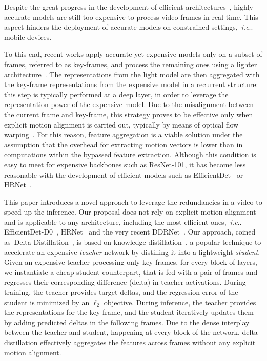 \documentclass[runningheads]{llncs}
\makeatletter
\newcommand{\deltadist}{Delta Distillation~}
\DeclareRobustCommand\onedot{\futurelet\@let@token\@onedot}
\def\@onedot{\ifx\@let@token.\else.\null\fi\xspace}
\def\ie{\emph{i.e}\onedot} \def\Ie{\emph{I.e}\onedot}
\makeatother
\begin{document}
Despite the great progress in the development of efficient architectures~\cite{fasterseg,li2017PruningFF,zhang2016acceleratingvd,fanet,hrnet,efficientdet}, highly accurate models are still too expensive to process video frames in real-time.
This aspect hinders the deployment of accurate models on constrained settings,~\ie mobile devices.

To this end, recent works apply accurate yet expensive models only on a subset of frames, referred to as key-frames, and process the remaining ones using a lighter architecture~\cite{zhu17dff,accel,flow_guided,li2018low,liu2018mobile,memory_guided}. 
The representations from the light model are then aggregated with the key-frame representations from the expensive model in a recurrent structure: this step is typically performed at a deep layer, in order to leverage the representation power of the expensive model. 
Due to the misalignment between the current frame and key-frame, this strategy proves to be effective only when explicit motion alignment is carried out, typically by means of optical flow warping~\cite{zhu17dff,accel,flow_guided}.
For this reason, feature aggregation is a viable solution under the assumption that the overhead for extracting motion vectors is lower than in computations within the bypassed feature extraction.
Although this condition is easy to meet for expensive backbones such as ResNet-101, it has become less reasonable with the development of efficient models such as EfficientDet~\cite{efficientdet} or HRNet~\cite{hrnet}.

This paper introduces a novel approach to leverage the redundancies in a video to speed up the inference. 
Our proposal does not rely on explicit motion alignment and is applicable to any architecture, including the most efficient ones,~\ie EfficientDet-D0~\cite{efficientdet}, HRNet~\cite{hrnet} and the very recent DDRNet~\cite{ddrnet}. 
Our approach, coined as~\deltadist, is based on knowledge distillation~\cite{distillationsurvey,hinton}, a popular technique to accelerate an expensive \textit{teacher} network by distilling it into a lightweight \textit{student}.
Given an expensive teacher processing only key-frames, for every block of layers, we instantiate a cheap student counterpart, that is fed with a pair of frames and regresses their corresponding difference (delta) in teacher activations.
During training, the teacher provides target deltas, and the regression error of the student is minimized by an $\ell_2$ objective.
During inference, the teacher provides the representations for the key-frame, and the student iteratively updates them by adding predicted deltas in the following frames.
Due to the dense interplay between the teacher and student, happening at every block of the network, delta distillation effectively aggregates the features across frames without any explicit motion alignment.
\end{document}
